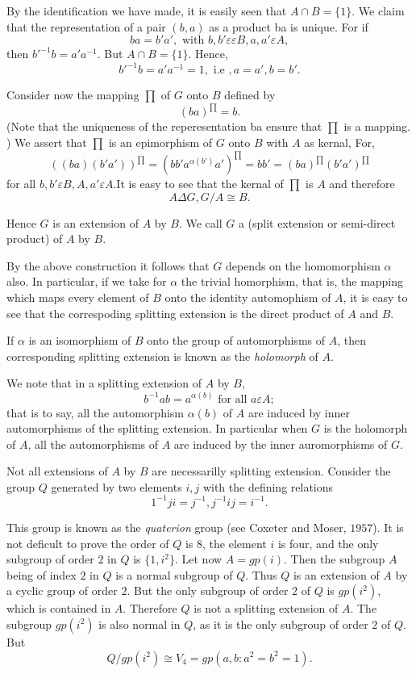 By the identification we have made, it is easily seen that $A \cap B=
\{ 1 \}$. We claim that the representation of a pair $(b, a)$ as a
product ba is unique. For if  
$$
ba= b' a', \text{ with } b,b' \varepsilon \varepsilon B, a,a' \varepsilon A,
$$
then ${b'^{-1}}b=a' a^{-1}$. But $A \cap B = \{ 1\}$. Hence,
$$
{b'}^{-1}b =a' a^{-1}=1, \text{ i.e }, a= a', b=b'. 
$$

Consider now the mapping $\prod$ of $G$ onto $B$ defined by
$$
(ba)^{\prod}=b.
$$
(Note that the uniqueness of the reperesentation ba ensure that
$\prod$ is a mapping. ) We assert that $\prod$ is an epimorphism of
$G$ onto $B$ with $A$ as kernal, For, 
$$
((ba)(b'a'))^{\prod} = (bb'a^{\alpha (b')}a')^{\prod} = bb'
=(ba)^{\prod} (b'a')^{\prod} 
$$
for all $b, b' \varepsilon B, A, a' \varepsilon A$.It is easy to see
that the kernal of $\prod$ is $A$ and therefore  
$$
A \Delta G,  G/A \cong B.
$$

Hence $G$ is an extension of $A$ by $B$. We call  $G$ a
(split extension or semi-direct product) of
$A$ by $B$. 

By the above construction it follows that $G$ depends on the
homomorphism $\alpha$ also. In particular, if we take for $\alpha$ the
trivial homorphism, that is, the mapping which maps every element of
$B$ onto the identity automophism of $A$, it is easy to see that the
correspoding splitting extension is the direct product of $A$ and
$B$. 

If $\alpha$ is an isomorphism of $B$ onto the group of automorphisms
of $A$, then corresponding splitting extension is known as the
\textit{holomorph} of $A$. 

We note that in a splitting extension of $A$ by $B$, 
$$
b^{-1} ab=a^{\alpha (b)} \text{ for all } a \varepsilon A ;
$$
that is to say, all the automorphism $\alpha (b)$ of $A$ are induced
by inner automorphisms of the splitting extension.  In particular when
$G$ is the holomorph of $A$, all the automorphisms of $A$ are induced
by the inner auromorphisms of $G$. 

Not all extensions of $A$ by $B$ are necessarilly splitting
extension. Consider the group $Q$ generated by two elements $i, j$
with the defining relations  
$$
1^{-1}ji = j^{-1}, j^{-1}ij =i^{-1}.
$$

This group is known as the \textit{quaterion} group (see Coxeter and
Moser, $1957$). It is not deficult to prove the order of $Q$ is $8$,
the element $i$ is four, and the only subgroup of order $2$ in $Q$ is
$\{ 1, i^2 \}$. Let now $A= gp(i)$. Then the subgroup $A$ being of
index $2$ in $Q$ is a normal subgroup of $Q$. Thus $Q$ is an extension
of $A$ by a cyclic group of order $2$. But the only subgroup of order
$2$ of $Q$ is $gp(i^2)$, which  is contained in $A$. Therefore $Q$ is
not a splitting extension of $A$. The subgroup $gp(i^2)$ is also
normal in $Q$, as it is the only subgroup of order $2$ of $Q$. But  
$$
Q/gp(i^2) \cong V_4 = gp(a,b: a^2= b^2 =1).
$$

